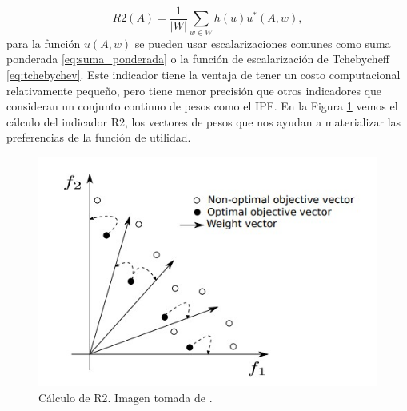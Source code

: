 \begin{equation} \label{eq:R2}
    R2(A)=\frac{1}{|W|}\sum_{w\in W} h(u)u^*(A,w), \nonumber
\end{equation}
para la función $u(A,w)$ se pueden usar escalarizaciones comunes como suma ponderada \eqref{eq:suma_ponderada} o la función de escalarización de Tchebycheff \eqref{eq:tchebychev}. Este indicador tiene la ventaja de tener un costo computacional relativamente pequeño, pero tiene menor precisión que otros indicadores que consideran un conjunto continuo de pesos como el IPF. En la Figura \ref{fig:R2} vemos el cálculo del indicador R2, los vectores de pesos que nos ayudan a materializar las preferencias de la función de utilidad.

\begin{figure}[H]
    \centering
    \includegraphics[scale=.6]{./Figuras/R2.jpg} 
    \caption[R2]{Cálculo de R2. Imagen tomada de \cite{tesis_mst_guillermo}.}
    \label{fig:R2}
\end{figure}


